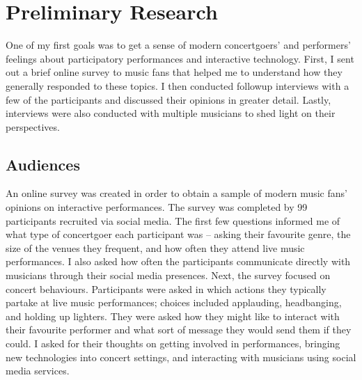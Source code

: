 \chapter{Preliminary Research}

One of my first goals was to get a sense of modern concertgoers' and performers' feelings about participatory performances and interactive technology. First, I sent out a brief online survey to music fans that helped me to understand how they generally responded to these topics. I then conducted followup interviews with a few of the participants and discussed their opinions in greater detail. Lastly, interviews were also conducted with multiple musicians to shed light on their perspectives.

\section{Audiences}

An online survey was created in order to obtain a sample of modern music fans' opinions on interactive performances. The survey was completed by 99 participants recruited via social media. The first few questions informed me of what type of concertgoer each participant was -- asking their favourite genre, the size of the venues they frequent, and how often they attend live music performances. I also asked how often the participants communicate directly with musicians through their social media presences. Next, the survey focused on concert behaviours. Participants were asked in which actions they typically partake at live music performances; choices included applauding, headbanging, and holding up lighters. They were asked how they might like to interact with their favourite performer and what sort of message they would send them if they could. I asked for their thoughts on getting involved in performances, bringing new technologies into concert settings, and interacting with musicians using social media services.

